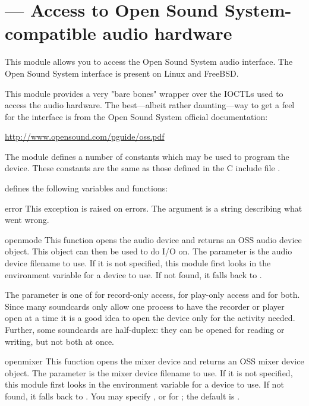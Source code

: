 \section{ ---
         Access to Open Sound System-compatible audio hardware}


This module allows you to access the Open Sound System audio interface.
The Open Sound System interface is present on Linux and FreeBSD.

This module provides a very "bare bones" wrapper over the IOCTLs used to
access the audio hardware.  The best---albeit rather daunting---way to
get a feel for the interface is from the Open Sound System official
documentation:

\url{http://www.opensound.com/pguide/oss.pdf}

The module defines a number of constants which may be used to program
the device.  These constants are the same as those defined in the C
include file .

 defines the following variables and functions:

\begin{excdesc}{error}
This exception is raised on errors.  The argument is a string describing
what went wrong.
\end{excdesc}

\begin{funcdesc}{open}{mode}
This function opens the audio device and returns an OSS audio device
object.  This object can then be used to do I/O on.  The 
parameter is the audio device filename to use.  If it is not specified,
this module first looks in the environment variable  for
a device to use.  If not found, it falls back to .

The  parameter is one of  for record-only access,
 for play-only access and  for both.  Since many
soundcards only allow one process to have the recorder or player open at
a time it is a good idea to open the device only for the activity
needed.  Further, some soundcards are half-duplex: they can be opened
for reading or writing, but not both at once.
\end{funcdesc}

\begin{funcdesc}{openmixer}{} This function
opens the mixer device and returns an OSS mixer device object.  The
 parameter is the mixer device filename to use.  If it is
not specified, this module first looks in the environment variable
 for a device to use.  If not found, it falls back to
.  You may specify ,  or
 for ; the default is .

\end{funcdesc}


